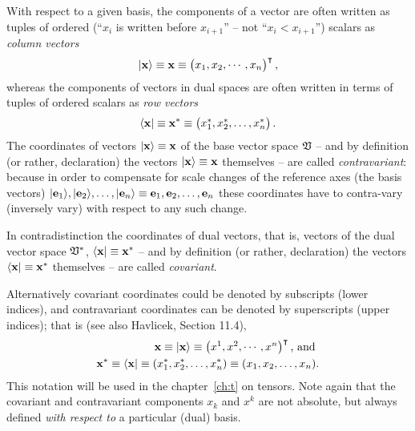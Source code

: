 With respect to a given basis,
the components of a vector are often written as tuples of ordered
(``$x_i$ is written before $x_{i+1}$'' -- not ``$x_i < x_{i+1}$'')
scalars  as {\em column vectors}
\begin{equation}
\vert {\bf x} \rangle
\equiv
{\bf x}
\equiv
\begin{pmatrix}
x_1,x_2,
\cdots ,
x_n
\end{pmatrix}^\intercal
,
\end{equation}
whereas the components of vectors in dual spaces are often written in terms of
tuples of ordered
scalars  as {\em row vectors}
\begin{equation}
\langle {\bf x} \vert
\equiv
{\bf x}^\ast \equiv
\begin{pmatrix}
x_1^\ast ,x_2^\ast ,\ldots , x_n^\ast
\end{pmatrix}
.
\end{equation}
The coordinates  of  vectors $\vert {\bf x} \rangle
\equiv
{\bf x}
$
of the base vector space ${\frak V}$
-- and by definition (or rather, declaration) the vectors $\vert {\bf x} \rangle
\equiv
{\bf x}
$ themselves --
are called
{\em contravariant}:
because in order to compensate for scale changes of the reference axes (the basis vectors)
$\vert {\bf e}_1 \rangle ,\vert  {\bf e}_2\rangle ,\ldots ,\vert {\bf e}_n\rangle
\equiv
{\bf e}_1, {\bf e}_2,\ldots ,{\bf e}_n$
these coordinates have to contra-vary (inversely vary)  with respect to any such change.

In contradistinction the coordinates of dual vectors,
that is, vectors of the dual vector space ${\frak V}^\ast$,
$\langle {\bf x} \vert
\equiv
{\bf x}^\ast $ -- and by definition (or rather, declaration) the vectors $\langle {\bf x} \vert
\equiv
{\bf x}^\ast $ themselves --
are called
{\em covariant}.

Alternatively covariant coordinates could be denoted by subscripts (lower indices),
and contravariant coordinates can be denoted by superscripts (upper indices); that is
(see also
Havlicek\cite{havlicek-laftm}, Section 11.4),
\begin{equation}
\begin{split}
{\bf x}  \equiv
\vert {\bf x}  \rangle \equiv
\begin{pmatrix}
x^1,
x^2,
\cdots ,
x^n
\end{pmatrix}^\intercal
\textrm{, and }
\\
 {\bf x}^\ast \equiv
\langle {\bf x}  \vert \equiv
(x_1^\ast ,x_2^\ast ,\ldots , x_n^\ast  ) \equiv   (x_1,x_2,\ldots , x_n )
.
\end{split}
\end{equation}
This notation will be used in the chapter~\ref{ch:t} on tensors.
Note again that the covariant and contravariant components
$x_k$ and $x^k$ are not absolute, but always defined {\em with respect to}
a particular (dual) basis.

